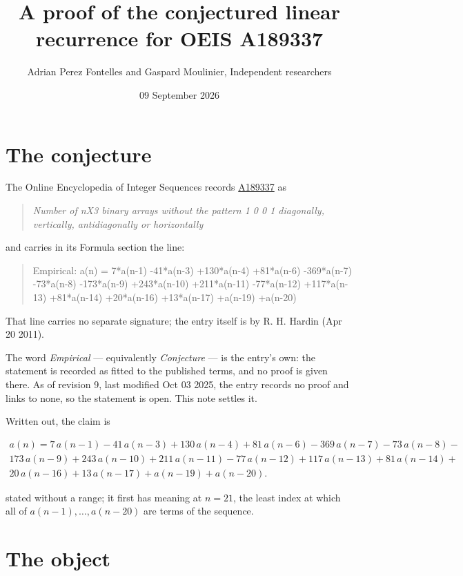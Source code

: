 \documentclass[11pt]{article}
\title{A proof of the conjectured linear recurrence for OEIS A189337}
\author{Adrian Perez Fontelles and Gaspard Moulinier, Independent researchers}
\date{09 September 2026}
\theoremstyle{definition}
\begin{document}
\maketitle
\section{The conjecture}

The Online Encyclopedia of Integer Sequences records \href{https://oeis.org/A189337}{A189337} as

\begin{quote}\itshape Number of nX3 binary arrays without the pattern 1 0 0 1 diagonally, vertically, antidiagonally or horizontally\end{quote}

and carries in its Formula section the line:

\begin{quote}\ttfamily Empirical: a(n) = 7*a(n-1) -41*a(n-3) +130*a(n-4) +81*a(n-6) -369*a(n-7) -73*a(n-8) -173*a(n-9) +243*a(n-10) +211*a(n-11) -77*a(n-12) +117*a(n-13) +81*a(n-14) +20*a(n-16) +13*a(n-17) +a(n-19) +a(n-20)\end{quote}

That line carries no separate signature; the entry itself is by R. H. Hardin (Apr 20 2011).

The word {\itshape Empirical} --- equivalently {\itshape Conjecture} --- is the entry's own: the statement is recorded as fitted to the published terms, and no proof is given there. As of revision 9, last modified Oct 03 2025, the entry records no proof and links to none, so the statement is open. This note settles it.

Written out, the claim is

\begin{multline*} a(n) = 7\,a(n-1) - 41\,a(n-3) + 130\,a(n-4) + 81\,a(n-6) - 369\,a(n-7) - 73\,a(n-8) - \\ 173\,a(n-9) + 243\,a(n-10) + 211\,a(n-11) - 77\,a(n-12) + 117\,a(n-13) + 81\,a(n-14) + \\ 20\,a(n-16) + 13\,a(n-17) + a(n-19) + a(n-20). \end{multline*}

stated without a range; it first has meaning at $n = 21$, the least index at which all of $a(n-1),\dots,a(n-20)$ are terms of the sequence.

\section{The object}
\end{document}
